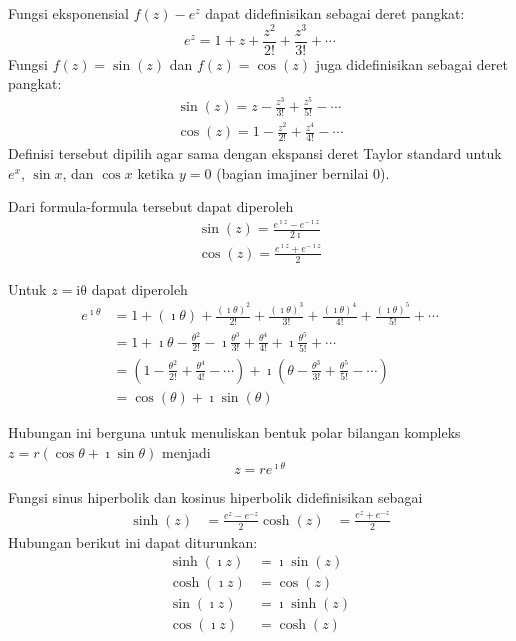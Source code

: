 Fungsi eksponensial $f(z) - e^{z}$ dapat didefinisikan sebagai
deret pangkat:
\begin{equation}
e^{z} = 1 + z + \frac{z^{2}}{2!} + \frac{z^{3}}{3!} + \cdots
\end{equation}
%
Fungsi $f(z) = \sin(z)$ dan $f(z) = \cos(z)$ juga didefinisikan
sebagai deret pangkat:
\begin{align*}
\sin(z) = z - \frac{z^{3}}{3!} + \frac{z^{5}}{5!} - \cdots \\
\cos(z) = 1 - \frac{z^{2}}{2!} + \frac{z^{4}}{4!} - \cdots
\end{align*}
Definisi tersebut dipilih agar sama dengan ekspansi deret Taylor standard
untuk $e^{x}$, $\sin x$, dan $\cos x$ ketika $y=0$ (bagian imajiner
bernilai 0).

Dari formula-formula tersebut dapat diperoleh
\begin{align}
\sin(z) = \frac{e^{\imath z}-e^{-\imath z}}{2\imath } \\
\cos(z) = \frac{e^{\imath z}+e^{-\imath z}}{2}
\end{align}

Untuk $z = \mathrm{i\theta}$ dapat diperoleh
\begin{align*}
e^{\imath \theta} & = 1 + (\imath \theta) +
  \frac{(\imath \theta)^{2}}{2!} +
  \frac{(\imath \theta)^{3}}{3!} +
  \frac{(\imath \theta)^{4}}{4!} +
  \frac{(\imath \theta)^{5}}{5!} + \cdots \\
 & = 1 + \imath \theta - \frac{\theta^{2}}{2!} - \imath \frac{\theta^{3}}{3!} +
     \frac{\theta^{4}}{4!} + \imath \frac{\theta^{5}}{5!} + \cdots \\
 & = \left(1-\frac{\theta^{2}}{2!}+\frac{\theta^{4}}{4!}-\cdots\right) + \imath \left(\theta-\frac{\theta^{3}}{3!}+\frac{\theta^{5}}{5!}-\cdots\right)\\
 & = \cos(\theta) + \imath  \sin(\theta)
\end{align*}

Hubungan ini berguna untuk menuliskan bentuk polar bilangan kompleks
$z=r(\cos\theta+\imath \sin\theta)$ menjadi
\begin{equation}
z = r e^{\imath \theta}
\end{equation}

Fungsi sinus hiperbolik dan kosinus hiperbolik didefinisikan sebagai
\begin{align}
\sinh(z) & = \frac{e^{z} - e^{-z}}{2}
\cosh(z) & = \frac{e^{z} + e^{-z}}{2}
\end{align}
Hubungan berikut ini dapat diturunkan:
\begin{align}
\sinh(\imath z) & = \imath  \sin(z) \\
\cosh(\imath z) & = \cos(z) \\
\sin(\imath z) & = \imath \sinh(z) \\
\cos(\imath z) & = \cosh(z)
\end{align}

